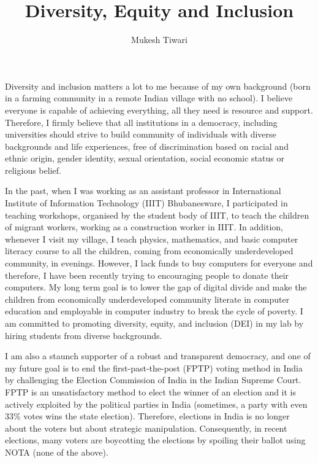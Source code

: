 \documentclass[a4paper]{article}
\title{Diversity, Equity and Inclusion}
\author{Mukesh Tiwari}
\date{}
\begin{document}
\fontsize{12}{15}
\selectfont
\maketitle

Diversity and inclusion matters a lot to me because of my own background (born in 
a farming community in a remote Indian village with no school). I believe everyone is capable of 
achieving everything, all they need is resource and support. Therefore,  I firmly believe that 
all institutions in a democracy, including universities should strive to build
community of individuals with diverse backgrounds and life experiences, 
free of discrimination based on racial and ethnic origin, gender identity, 
sexual orientation, social economic status or religious belief. 

\vspace{0.5cm}
In the past, when I was working as an assistant professor in International Institute of 
Information Technology (IIIT) Bhubanesware, I participated in teaching 
workshops, organised by the student body of IIIT, to teach the 
children of migrant workers, working as a construction worker in IIIT.
In addition, whenever I visit my village, I teach physics, mathematics, and basic 
computer literacy course to all the children, coming from 
economically underdeveloped community, in evenings. However, I lack funds to buy computers for everyone 
and therefore, I have been recently trying to encouraging people to donate 
their computers. My long term goal is to lower the gap of digital divide and make the 
children from economically underdeveloped community literate in computer education 
and employable in computer industry to break the cycle of poverty. 
I am committed to promoting diversity, equity, and inclusion (DEI) in my lab by 
hiring students from diverse backgrounds.



\vspace{0.5cm}
I am also a staunch supporter of a robust and transparent 
democracy, and one of my future goal is to end the 
first-past-the-post (FPTP) voting method in India by challenging the Election 
Commission of India in the Indian Supreme Court. FPTP is an unsatisfactory method 
to elect the winner of an election and it is actively exploited by 
the political parties in India (sometimes, a party with even 33\% votes 
wins the state election). Therefore, elections in India is no longer 
about the voters but about strategic manipulation. Consequently, 
in recent elections, many voters are boycotting the elections by spoiling their 
ballot using NOTA (none of the above). 
\end{document}
